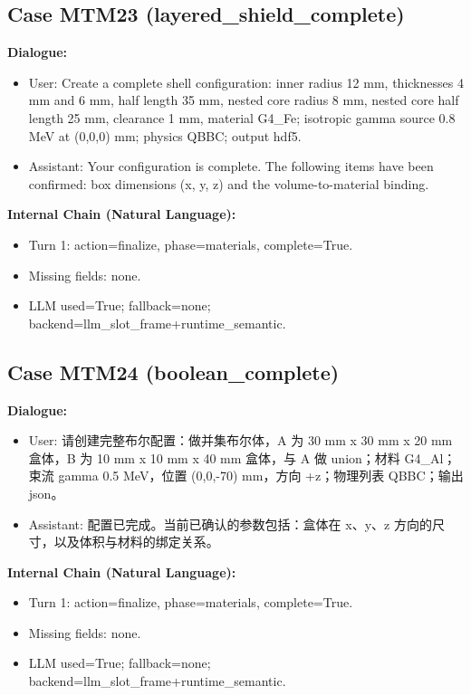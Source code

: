 \documentclass[11pt]{ctexart}
\begin{document}
\subsection{Case MTM23 (layered\_shield\_complete)}
\textbf{Dialogue:}
\begin{itemize}
\item User: Create a complete shell configuration: inner radius 12 mm, thicknesses 4 mm and 6 mm, half length 35 mm, nested core radius 8 mm, nested core half length 25 mm, clearance 1 mm, material G4\_Fe; isotropic gamma source 0.8 MeV at (0,0,0) mm; physics QBBC; output hdf5.
\item Assistant: Your configuration is complete. The following items have been confirmed: box dimensions (x, y, z) and the volume-to-material binding.
\end{itemize}
\textbf{Internal Chain (Natural Language):}
\begin{itemize}
\item Turn 1: action=finalize, phase=materials, complete=True.
\item Missing fields: none.
\item LLM used=True; fallback=none; backend=llm\_slot\_frame+runtime\_semantic.
\end{itemize}
\subsection{Case MTM24 (boolean\_complete)}
\textbf{Dialogue:}
\begin{itemize}
\item User: 请创建完整布尔配置：做并集布尔体，A 为 30 mm x 30 mm x 20 mm 盒体，B 为 10 mm x 10 mm x 40 mm 盒体，与 A 做 union；材料 G4\_Al；束流 gamma 0.5 MeV，位置 (0,0,-70) mm，方向 +z；物理列表 QBBC；输出 json。
\item Assistant: 配置已完成。当前已确认的参数包括：盒体在 x、y、z 方向的尺寸，以及体积与材料的绑定关系。
\end{itemize}
\textbf{Internal Chain (Natural Language):}
\begin{itemize}
\item Turn 1: action=finalize, phase=materials, complete=True.
\item Missing fields: none.
\item LLM used=True; fallback=none; backend=llm\_slot\_frame+runtime\_semantic.
\end{itemize}
\end{document}
